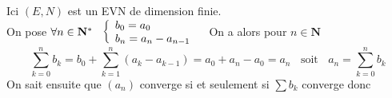 		Ici $(E,N)$ est un EVN de dimension finie.\\${}$ \\On pose $\forall n\in\mathbf{N}^* ~~ \left\{ \begin{array}{l}  b_0 = a_0 \\ b_n = a_n - a_{n-1} \end{array}
			\right.~~$ On a alors pour $n\in \mathbf{N}$ \\
			\[ \sum_{k=0}^{n} b_k = b_0 + \sum_{k=1}^{n} (a_k - a_{k-1} ) = a_0 +a_n - a_0 = a_n ~~~~\mathrm{soit} ~~~~ a_n = \sum_{k=0}^{n} b_k\]
			On sait ensuite que $(a_n)$ converge si et seulement si $\sum b_k$ converge donc 
			
		\begin{center}
		\end{center} \medskip
		

\fin